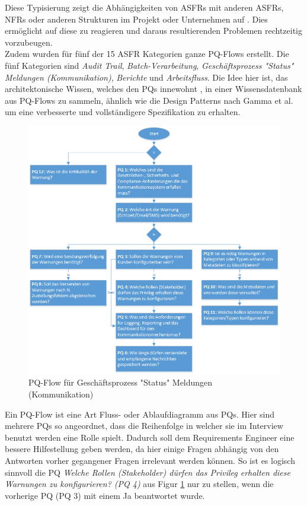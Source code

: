 Diese Typisierung zeigt die Abhängigkeiten von ASFRs mit anderen ASFRs, NFRs oder anderen Strukturen im Projekt oder Unternehmen auf \cite{Ros02}. Dies ermöglicht auf diese zu reagieren und daraus resultierenden Problemen rechtzeitig vorzubeugen. \\

Zudem wurden für fünf der 15 ASFR Kategorien ganze PQ-Flows erstellt. Die fünf Kategorien sind \textit{Audit Trail}, \textit{Batch-Verarbeitung}, \textit{Geschäftsprozess "Status" Meldungen (Kommunikation)}, \textit{Berichte} und \textit{Arbeitsfluss}. Die Idee hier ist, das architektonische Wissen, welches den PQs innewohnt \cite{Ros02}, in einer Wissensdatenbank aus PQ-Flows zu sammeln, ähnlich wie die Design Patterns nach Gamma et al. \cite{Ros03} um eine verbesserte und vollständigere Spezifikation zu erhalten. \\

\begin{figure}[h]
	\centering
	\includegraphics[scale=0.45]{pqflow_communication.png} 
	\caption{PQ-Flow für Geschäftsprozess "Status" Meldungen (Kommunikation) \cite{Ros01}}\label{fig_pqflow_communication}
\end{figure}

Ein PQ-Flow ist eine Art Fluss- oder Ablaufdiagramm aus PQs. Hier sind mehrere PQs so angeordnet, dass die Reihenfolge in welcher sie im Interview benutzt werden eine Rolle spielt. Dadurch soll dem Requirements Engineer eine bessere Hilfestellung geben werden, da hier einige Fragen abhängig von den Antworten vorher gegangener Fragen irrelevant werden können. So ist es logisch sinnvoll die PQ \textit{Welche Rollen (Stakeholder) dürfen das Privileg erhalten diese Warnungen zu konfigurieren? (PQ 4)} aus Figur \ref{fig_pqflow_communication} nur zu stellen, wenn die vorherige PQ (PQ 3) mit einem Ja beantwortet wurde. \\

